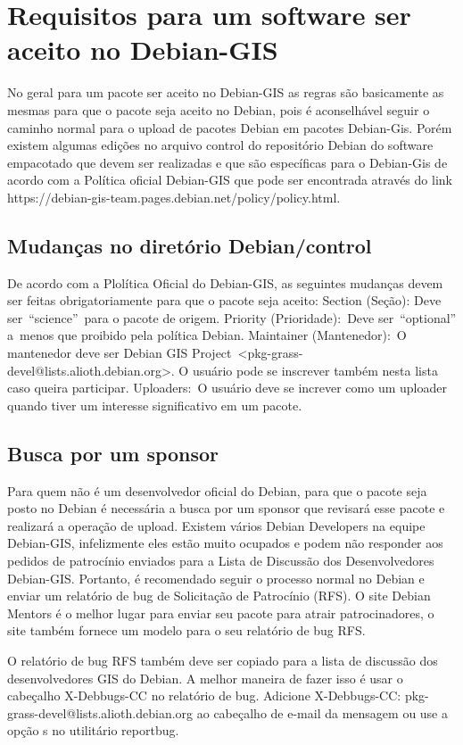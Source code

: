 \section{Requisitos para um software ser aceito no Debian-GIS}

No geral para um pacote ser aceito no Debian-GIS as regras são basicamente as mesmas para que o pacote seja aceito no Debian, pois é aconselhável seguir o caminho normal para o upload de pacotes Debian em pacotes Debian-Gis. Porém existem algumas edições no arquivo control do repositório Debian do software empacotado que devem ser realizadas e que são específicas para o Debian-Gis de acordo com a Política oficial Debian-GIS que pode ser encontrada através do link https://debian-gis-team.pages.debian.net/policy/policy.html.

\subsection{Mudanças no diretório Debian/control}

De acordo com a Plolítica Oficial do Debian-GIS, as seguintes mudanças devem ser feitas obrigatoriamente para que o pacote seja aceito:
Section (Seção): Deve ser “science” para o pacote de origem.
Priority (Prioridade): Deve ser “optional” a menos que proibido pela política Debian.
Maintainer (Mantenedor): O mantenedor deve ser Debian GIS Project <pkg-grass-devel@lists.alioth.debian.org>. O usuário pode se inscrever também nesta lista caso queira participar.
Uploaders: O usuário deve se increver como um uploader quando tiver um interesse significativo em um pacote.

\subsection{Busca por um sponsor}

Para quem não é um desenvolvedor oficial do Debian, para que o pacote seja posto no Debian é necessária a busca por um sponsor que revisará esse pacote e realizará a operação de upload. Existem vários Debian Developers na equipe Debian-GIS, infelizmente eles estão muito ocupados e podem não responder aos pedidos de patrocínio enviados para a Lista de Discussão dos Desenvolvedores Debian-GIS. Portanto, é recomendado seguir o processo normal no Debian e enviar um relatório de bug de Solicitação de Patrocínio (RFS). O site Debian Mentors é o melhor lugar para enviar seu pacote para atrair patrocinadores, o site também fornece um modelo para o seu relatório de bug RFS.

O relatório de bug RFS também deve ser copiado para a lista de discussão dos desenvolvedores GIS do Debian. A melhor maneira de fazer isso é usar o cabeçalho X-Debbugs-CC no relatório de bug. Adicione X-Debbugs-CC: pkg-grass-devel@lists.alioth.debian.org ao cabeçalho de e-mail da mensagem ou use a opção s no utilitário reportbug.
